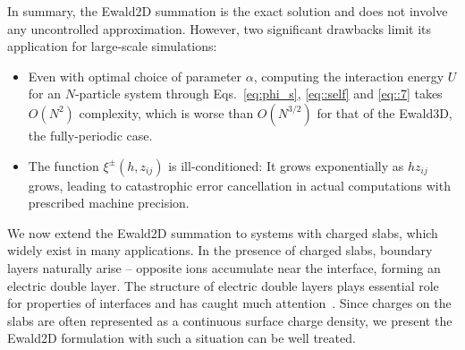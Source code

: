 In summary, the Ewald2D summation is the exact solution and does not involve any uncontrolled approximation. 
However, two significant drawbacks limit its application for large-scale simulations:
\begin{itemize}
	\item Even with optimal choice of parameter $\alpha$, computing the interaction energy $U$ for an $N$-particle system through Eqs.~\eqref{eq:phi_s}, \eqref{eq::self} and \eqref{eq::7} takes $O(N^2)$ complexity, which is worse than $O(N^{3/2})$ for that of the Ewald3D, the fully-periodic case.
	\item The function $\xi^{\pm}(h, z_{ij})$ is ill-conditioned: It grows exponentially as $h z_{ij}$ grows, leading to catastrophic error cancellation in actual computations with prescribed machine precision.
\end{itemize}


We now extend the Ewald2D summation to systems with charged slabs, which widely exist in many applications.
In the presence of charged slabs, boundary layers naturally arise -- opposite ions accumulate near the interface, forming an electric double layer. The structure of electric double layers plays essential role for properties of interfaces and has caught much attention~\cite{messina2004effect,breitsprecher2014coarse,moreira2002simulations}. Since charges on the slabs are often represented as a continuous surface charge density, we present the Ewald2D formulation with such a situation can be well treated.

